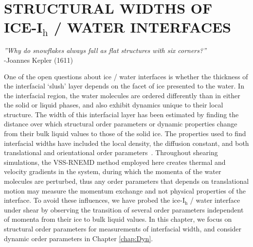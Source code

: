 
\chapter{STRUCTURAL WIDTHS OF ICE-I$_\mathrm{h}$ / WATER
  INTERFACES}\label{chap:Str}


\begin{flushright}
\textit{''Why do snowflakes always fall as flat structures with six corners?''} \\
-Joannes Kepler (1611) \\
\end{flushright}

One of the open questions about ice / water interfaces is whether the
thickness of the interfacial `slush' layer depends on the facet of ice
presented to the water. In the interfacial region, the water molecules
are ordered differently than in either the solid or liquid phases, and
also exhibit dynamics unique to their local structure.  The width of
this interfacial layer has been estimated by finding the distance over
which structural order parameters or dynamic properties change from
their bulk liquid values to those of the solid ice. The properties
used to find interfacial widths have included the local density, the
diffusion constant, and both translational and orientational order
parameters~\cite{Karim1988,Karim1990,Hayward2001,Hayward2002,Bryk2002,Gay2002,Louden2013a}. Throughout
shearing simulations, the VSS-RNEMD method employed here creates
thermal and velocity gradients in the system, during which the momenta
of the water molecules are perturbed, thus any order parameters that
depends on translational motion may measure the momentum exchange and
not physical properties of the interface. To avoid these influences,
we have probed the ice-I$_\mathrm{h}$ / water interface under shear by
observing the transition of several order parameters independent of
momenta from their ice to bulk liquid values.  In this chapter, we
focus on structural order parameters for measurements of interfacial
width, and consider dynamic order parameters in Chapter
\ref{chap:Dyn}.


